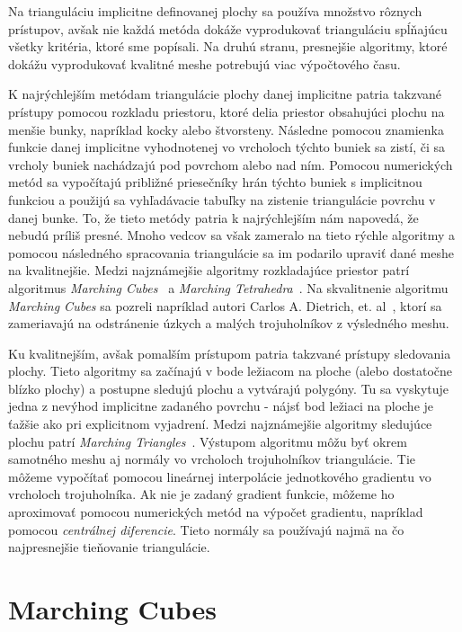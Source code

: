 Na trianguláciu implicitne definovanej plochy sa používa množstvo rôznych prístupov, 
avšak nie každá metóda dokáže vyprodukovať trianguláciu spĺňajúcu všetky kritéria, 
ktoré sme popísali. Na druhú stranu, presnejšie algoritmy, ktoré dokážu vyprodukovať 
kvalitné meshe potrebujú viac výpočtového času. 

K najrýchlejším metódam triangulácie plochy danej implicitne patria takzvané prístupy pomocou rozkladu
priestoru, ktoré delia priestor obsahujúci plochu na menšie bunky, napríklad kocky alebo štvorsteny. 
Následne pomocou znamienka funkcie danej implicitne vyhodnotenej vo vrcholoch týchto buniek
sa zistí, či sa vrcholy buniek nachádzajú pod povrchom alebo nad ním. 
Pomocou numerických metód sa vypočítajú približné priesečníky hrán týchto buniek s 
implicitnou funkciou a použijú sa vyhľadávacie tabuľky na zistenie triangulácie povrchu v danej bunke. 
To, že tieto metódy patria k najrýchlejším nám napovedá, že nebudú príliš presné. Mnoho vedcov sa
však zameralo na tieto rýchle algoritmy a pomocou následného spracovania triangulácie sa im 
podarilo upraviť dané meshe na kvalitnejšie. 
Medzi najznámejšie algoritmy rozkladajúce priestor
patrí algoritmus \textit{Marching Cubes}~\cite{lorensen1987marching} a \textit{Marching Tetrahedra}~\cite{doi1991efficient}. 
Na skvalitnenie algoritmu \textit{Marching Cubes} sa pozreli napríklad
autori Carlos A. Dietrich, et. al~\cite{dietrich2009marching}, 
ktorí sa zameriavajú na odstránenie úzkych a malých trojuholníkov
z výsledného meshu.

Ku kvalitnejším, avšak pomalším prístupom patria takzvané prístupy sledovania plochy.
Tieto algoritmy sa začínajú v bode ležiacom na ploche (alebo dostatočne blízko plochy) a 
postupne sledujú plochu a vytvárajú polygóny. Tu sa vyskytuje jedna z nevýhod implicitne zadaného
povrchu - nájsť bod ležiaci na ploche je ťažšie ako pri explicitnom vyjadrení. Medzi najznámejšie 
algoritmy sledujúce plochu patrí \textit{Marching Triangles}~\cite{hilton1996marching}.
Výstupom algoritmu môžu byť okrem samotného meshu aj normály vo vrcholoch trojuholníkov triangulácie. 
Tie môžeme vypočítať pomocou lineárnej interpolácie jednotkového gradientu vo vrcholoch trojuholníka. 
Ak nie je zadaný gradient funkcie, môžeme ho aproximovať pomocou numerických metód na výpočet gradientu,
napríklad pomocou \textit{centrálnej diferencie}.
Tieto normály sa používajú najmä na čo najpresnejšie tieňovanie triangulácie.

\section{Marching Cubes}

